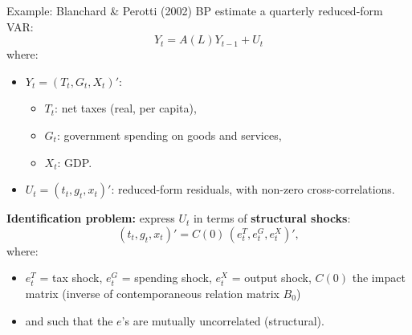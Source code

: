 \documentclass{beamer}
\begin{document}
\begin{frame}{Example: Blanchard \& Perotti (2002)}
\small
BP estimate a quarterly reduced-form VAR:
\[
Y_t = A(L) Y_{t-1} + U_t
\]
where:
\begin{itemize}
  \item $Y_t = (T_t, G_t, X_t)'$:
  \begin{itemize}
    \item $T_t$: net taxes (real, per capita),
    \item $G_t$: government spending on goods and services,
    \item $X_t$: GDP.
  \end{itemize}
  \item $U_t = (t_t, g_t, x_t)'$: reduced-form residuals, with
        non-zero cross-correlations.
\end{itemize}

\medskip
\textbf{Identification problem:} express $U_t$ in terms of
\textbf{structural shocks}:
\[
(t_t, g_t, x_t)' = C(0)\,(e^T_t, e^G_t, e^X_t)',
\]
where:
\begin{itemize}
  \item $e^T_t$ = tax shock, $e^G_t$ = spending shock, $e^X_t$ = output shock, $C(0)$ the impact matrix (inverse of contemporaneous relation matrix $B_0$)
  \item and such that the $e$'s are mutually uncorrelated (structural).
\end{itemize}
\end{frame}
\end{document}
